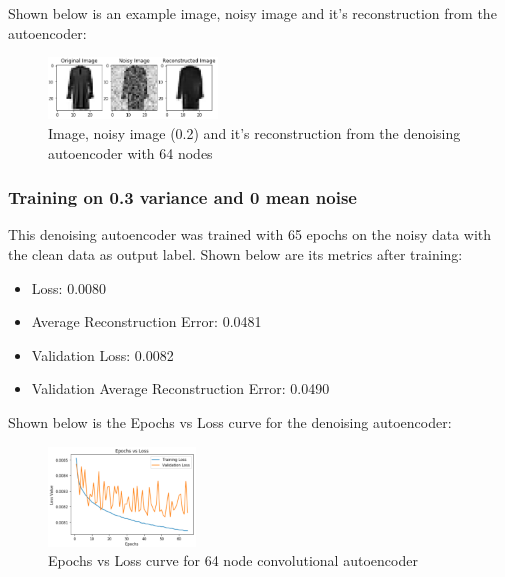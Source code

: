\documentclass[conference]{IEEEtran}
\begin{document}
    Shown below is an example image, noisy image and it's reconstruction from the autoencoder:

    \begin{figure}[H]
        \centering
        \captionsetup{justification=centering}
        \centering
            \includegraphics[width=0.4\textwidth]{39.png}
            \caption{Image, noisy image (0.2) and it's reconstruction from the denoising autoencoder with 64 nodes}
    \end{figure}




    \subsubsection{Training on 0.3 variance and 0 mean noise\\}

    This denoising autoencoder was trained with 65 epochs on the noisy data with the clean data as output label. Shown below
    are its metrics after training:

    \begin{itemize}
        \item Loss: 0.0080
        \item Average Reconstruction Error: 0.0481
        \item Validation Loss: 0.0082
        \item Validation Average Reconstruction Error: 0.0490
    \end{itemize}

    Shown below is the Epochs vs Loss curve for the denoising autoencoder:

    \begin{figure}[H]
        \centering
        \captionsetup{justification=centering}
        \centering
            \includegraphics[width=0.35\textwidth]{40.png}
            \caption{Epochs vs Loss curve for 64 node convolutional autoencoder}
    \end{figure}
\end{document}
